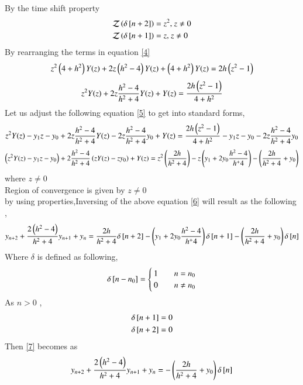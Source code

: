 \documentclass[journal]{IEEEtran}
\begin{document}
By the time shift property 
\begin{align}
    \mathcal{Z}\left(\delta{}\left[n + 2\right]\right) &= z^2 \text{, } z \neq 0\\
    \mathcal{Z}\left(\delta{}\left[n + 1\right]\right) &= z \text{, } z \neq 0
\end{align}
By rearranging the terms in equation \eqref{4} \\
\begin{align}
z^2\left(4+h^2\right) Y(z) +2z\left(h^2-4\right) Y(z) +\left(4+h^2\right) Y(z) = 2h\left(z^2-1\right) 
\end{align}
\begin{align}
z^2 Y(z) + 2z \frac{h^2-4}{h^2+4}Y(z) +Y(z) = \frac{2h\left(z^2-1\right)}{4+h^2} \label{5}
\end{align}
Let us adjust the following equation \eqref{5} to get into standard forms,
\begin{align}
z^2 Y(z) -y_1z-y_0 + 2z \frac{h^2-4}{h^2+4}Y(z) - 2z \frac{h^2-4}{h^2+4}y_0  +Y(z) = \frac{2h\left(z^2-1\right)}{4+h^2} -y_1z-y_0 - 2z \frac{h^2-4}{h^2+4}y_0 
\end{align}
\begin{align}
\left(z^2 Y(z) -y_1z-y_0\right) + 2\frac{h^2-4}{h^2+4} \left(zY(z) - zy_0\right) +Y(z) = z^2 \left(\frac{2h}
{h^2+4}\right) - z \left(y_1 + 2y_0 \frac{h^2-4}{h^+4}\right) - \left(\frac{2h}{h^2+4} + y_0\right) \label{6}
\end{align}
where $z \neq 0$ \\
Region of convergence  is given by $z \neq 0$ \\
by using properties,Inversing of the above equation \eqref{6} will result as the following ,
\begin{align}
y_{n+2} + \frac{2\left(h^2-4\right)}{h^2+4} y_{n+1} + y_n = \frac{2h}{h^2+4} \delta {}\left[n+2\right] - \left(y_1 + 2y_0 \frac{h^2-4}{h^+4}\right) \delta {}\left[n+1\right] - \left(\frac{2h}{h^2+4} + y_0\right) \delta {}\left[n\right] \label{7}
\end{align}
Where $\delta$ is defined as following,
\begin{align}
    \delta{}\left[n - n_0\right] =
    \begin{cases}
        1 & \quad n = n_0\\
        0 & \quad n \neq n_0
    \end{cases}
\end{align}
As $n > 0$ , 
\begin{align}
\delta {}\left[n+1\right] = 0 \\
\delta {}\left[n+2\right] = 0
\end{align}
Then \eqref{7} becomes as 
\begin{align}
y_{n+2} + \frac{2\left(h^2-4\right)}{h^2+4} y_{n+1} + y_n = - \left(\frac{2h}{h^2+4} + y_0\right) \delta {}\left[n\right]
\end{align} 
\end{document}

